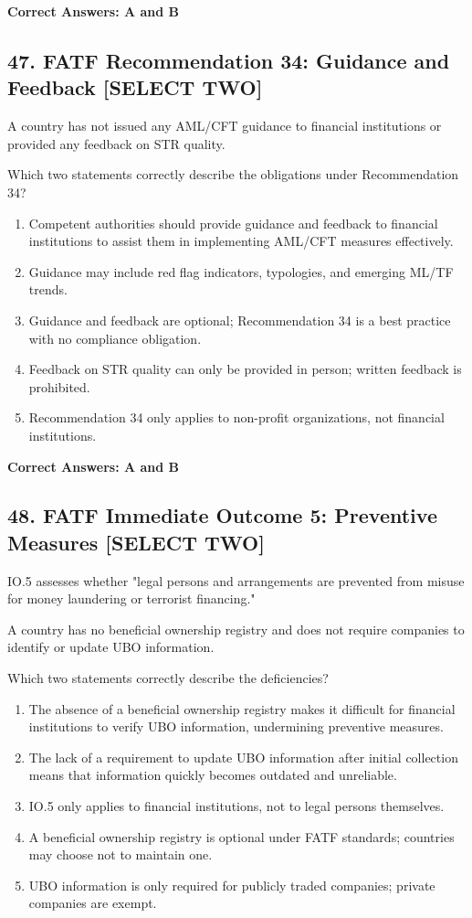 \documentclass[11pt,a4paper]{article}
\begin{document}
	\textbf{Correct Answers: A and B}
	
	\subsection{47. FATF Recommendation 34: Guidance and Feedback \textnormal{[SELECT TWO]}}
	
	A country has not issued any AML/CFT guidance to financial institutions or provided any feedback on STR quality.
	
	Which two statements correctly describe the obligations under Recommendation 34?
	
	\begin{enumerate}[label=\Alph*.]
		\item Competent authorities should provide guidance and feedback to financial institutions to assist them in implementing AML/CFT measures effectively.
		\item Guidance may include red flag indicators, typologies, and emerging ML/TF trends.
		\item Guidance and feedback are optional; Recommendation 34 is a best practice with no compliance obligation.
		\item Feedback on STR quality can only be provided in person; written feedback is prohibited.
		\item Recommendation 34 only applies to non-profit organizations, not financial institutions.
	\end{enumerate}
	
	\textbf{Correct Answers: A and B}
	
	\subsection{48. FATF Immediate Outcome 5: Preventive Measures \textnormal{[SELECT TWO]}}
	
	IO.5 assesses whether "legal persons and arrangements are prevented from misuse for money laundering or terrorist financing."
	
	A country has no beneficial ownership registry and does not require companies to identify or update UBO information.
	
	Which two statements correctly describe the deficiencies?
	
	\begin{enumerate}[label=\Alph*.]
		\item The absence of a beneficial ownership registry makes it difficult for financial institutions to verify UBO information, undermining preventive measures.
		\item The lack of a requirement to update UBO information after initial collection means that information quickly becomes outdated and unreliable.
		\item IO.5 only applies to financial institutions, not to legal persons themselves.
		\item A beneficial ownership registry is optional under FATF standards; countries may choose not to maintain one.
		\item UBO information is only required for publicly traded companies; private companies are exempt.
	\end{enumerate}
	
\end{document}
